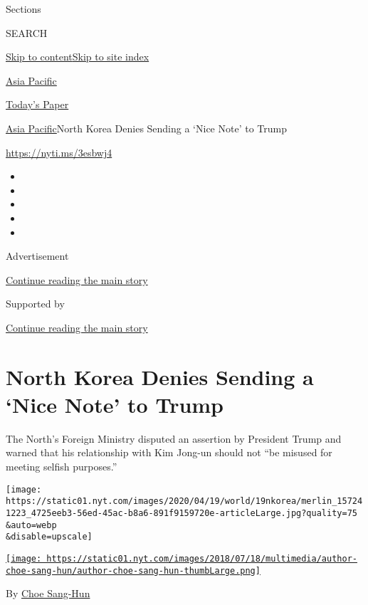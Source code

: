 Sections

SEARCH

\protect\hyperlink{site-content}{Skip to
content}\protect\hyperlink{site-index}{Skip to site index}

\href{https://www.nytimes.com/section/world/asia}{Asia Pacific}

\href{https://myaccount.nytimes.com/auth/login?response_type=cookie\&client_id=vi}{}

\href{https://www.nytimes.com/section/todayspaper}{Today's Paper}

\href{/section/world/asia}{Asia Pacific}\textbar{}North Korea Denies
Sending a `Nice Note' to Trump

\url{https://nyti.ms/3esbwj4}

\begin{itemize}
\item
\item
\item
\item
\item
\end{itemize}

Advertisement

\protect\hyperlink{after-top}{Continue reading the main story}

Supported by

\protect\hyperlink{after-sponsor}{Continue reading the main story}

\hypertarget{north-korea-denies-sending-a-nice-note-to-trump}{%
\section{North Korea Denies Sending a `Nice Note' to
Trump}\label{north-korea-denies-sending-a-nice-note-to-trump}}

​The North's Foreign Ministry ​disputed an assertion by President Trump
and warned that his relationship with Kim Jong-un should not ``be
misused for meeting selfish purposes.''

\texttt{[image: https://static01.nyt.com/images/2020/04/19/world/19nkorea/merlin\_157241223\_4725eeb3-56ed-45ac-b8a6-891f9159720e-articleLarge.jpg?quality=75\\\&auto=webp\\\&disable=upscale]}

\href{https://www.nytimes.com/by/choe-sang-hun}{\texttt{[image: https://static01.nyt.com/images/2018/07/18/multimedia/author-choe-sang-hun/author-choe-sang-hun-thumbLarge.png]}}

By \href{https://www.nytimes.com/by/choe-sang-hun}{Choe Sang-Hun}

